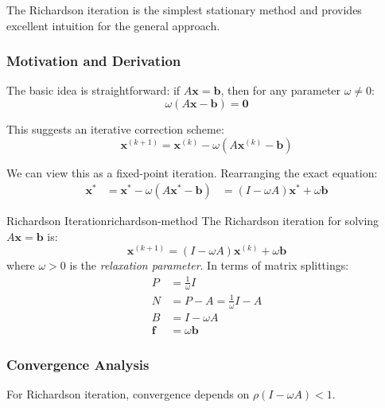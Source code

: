 The Richardson iteration is the simplest stationary method and provides excellent intuition for the general approach.

\subsubsection{Motivation and Derivation}

The basic idea is straightforward: if $A\mathbf{x} = \mathbf{b}$, then for any parameter $\omega \neq 0$:
\begin{equation}
    \omega(A\mathbf{x} - \mathbf{b}) = \mathbf{0}
\end{equation}

This suggests an iterative correction scheme:
\begin{equation}
    \mathbf{x}^{(k+1)} = \mathbf{x}^{(k)} - \omega(A\mathbf{x}^{(k)} - \mathbf{b})
    \label{eq:richardson-iteration}
\end{equation}

We can view this as a fixed-point iteration. Rearranging the exact equation:
\begin{align}
    \mathbf{x}^* &= \mathbf{x}^* - \omega(A\mathbf{x}^* - \mathbf{b})
    &= (I - \omega A)\mathbf{x}^* + \omega \mathbf{b}
\end{align}

\begin{definition}{Richardson Iteration}{richardson-method}
    The Richardson iteration for solving $A\mathbf{x} = \mathbf{b}$ is:
    \begin{equation}
        \mathbf{x}^{(k+1)} = (I - \omega A)\mathbf{x}^{(k)} + \omega \mathbf{b}
    \end{equation}
    where $\omega > 0$ is the \emph{relaxation parameter}. In terms of matrix splittings:
    \begin{align}
        P &= \frac{1}{\omega}I \\
        N &= P - A = \frac{1}{\omega}I - A \\
        B &= I - \omega A \\
        \mathbf{f} &= \omega \mathbf{b}
    \end{align}
\end{definition}

\subsubsection{Convergence Analysis}

For Richardson iteration, convergence depends on $\rho(I - \omega A) < 1$.

